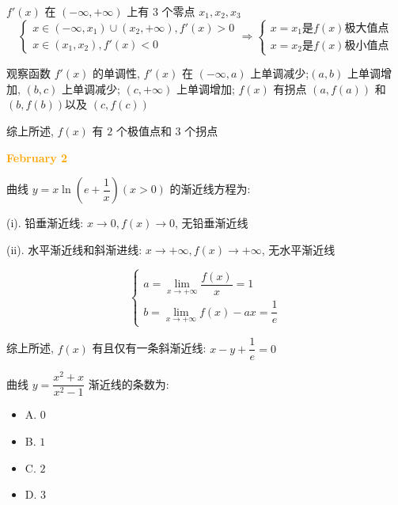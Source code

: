 \begin{solution}

	$f'(x)$ 在 $(-\infty,+\infty)$ 上有 $3$ 个零点 $x_{1},x_{2},x_{3}$
	$$\begin{cases}
	x\in(-\infty,x_{1})\cup (x_{2},+\infty), f'(x) > 0\\
	x\in(x_{1},x_{2}), f'(x) < 0
	\end{cases}\Rightarrow 
	\begin{cases}
	x = x_{1}\text{是} f(x) \text{极大值点}\\
	x = x_{2}\text{是} f(x) \text{极小值点}
	\end{cases}$$

	观察函数 $f'(x)$ 的单调性, $f'(x)$ 在 $(-\infty,a)$ 上单调减少;$(a,b)$ 上单调增加, $(b,c)$ 上单调减少; $(c,+\infty)$ 上单调增加;
	$f(x)$ 有拐点 $(a,f(a))$ 和 $(b,f(b))$以及 $(c,f(c))$

	综上所述, $f(x)$ 有 $2$ 个极值点和 $3$ 个拐点
\end{solution}

\textcolor{orange}{\textbf{February 2}}

\begin{example}[][Exam: 28.1.3]
	曲线 $y=x\ln\left( e+\dfrac{1}{x}\right)(x>0) $ 的渐近线方程为:
\end{example}

\begin{solution}

	(i). 铅垂渐近线: $x\to 0, f(x)\to 0$, 无铅垂渐近线

	(ii). 水平渐近线和斜渐进线: $x\to +\infty, f(x)\to +\infty$, 无水平渐近线

	$$\begin{cases}
	a = \lim\limits_{x\to +\infty}\dfrac{f(x)}{x} = 1\\
	b = \lim\limits_{x\to +\infty}f(x)-ax = \dfrac{1}{e}
	\end{cases}$$

	综上所述, $f(x)$ 有且仅有一条斜渐近线: $x-y+\dfrac{1}{e} = 0$
\end{solution}

\begin{example}[][Exam: 28.1.4]
	曲线 $y=\dfrac{x^{2}+x}{x^{2}-1}$ 渐近线的条数为:
\begin{itemize}
	\item A. $0$
	\item B. $1$
	\item C. $2$
	\item D. $3$
\end{itemize}
\end{example}

